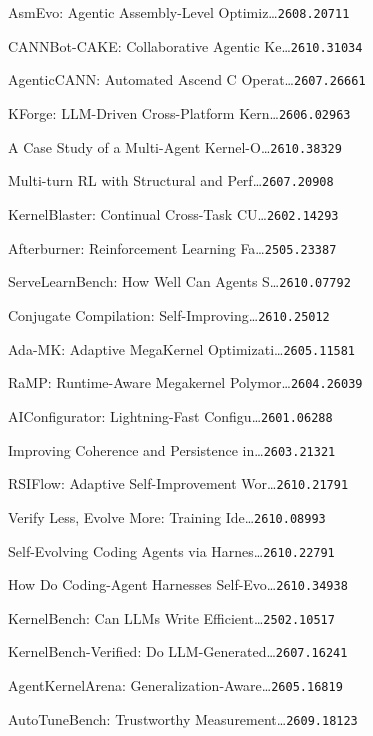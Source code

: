 \begin{refs}
[19] AsmEvo: Agentic Assembly-Level Optimiz\ldots{}\hfill{\texttt{2608.20711}}\par
[20] CANNBot-CAKE: Collaborative Agentic Ke\ldots{}\hfill{\texttt{2610.31034}}\par
[21] AgenticCANN: Automated Ascend C Operat\ldots{}\hfill{\texttt{2607.26661}}\par
[22] KForge: LLM-Driven Cross-Platform Kern\ldots{}\hfill{\texttt{2606.02963}}\par
[23] A Case Study of a Multi-Agent Kernel-O\ldots{}\hfill{\texttt{2610.38329}}\par
[24] Multi-turn RL with Structural and Perf\ldots{}\hfill{\texttt{2607.20908}}\par
[25] KernelBlaster: Continual Cross-Task CU\ldots{}\hfill{\texttt{2602.14293}}\par
[26] Afterburner: Reinforcement Learning Fa\ldots{}\hfill{\texttt{2505.23387}}\par
[27] ServeLearnBench: How Well Can Agents S\ldots{}\hfill{\texttt{2610.07792}}\par
[28] Conjugate Compilation: Self-Improving\ldots{}\hfill{\texttt{2610.25012}}\par
[29] Ada-MK: Adaptive MegaKernel Optimizati\ldots{}\hfill{\texttt{2605.11581}}\par
[30] RaMP: Runtime-Aware Megakernel Polymor\ldots{}\hfill{\texttt{2604.26039}}\par
[31] AIConfigurator: Lightning-Fast Configu\ldots{}\hfill{\texttt{2601.06288}}\par
[32] Improving Coherence and Persistence in\ldots{}\hfill{\texttt{2603.21321}}\par
[33] RSIFlow: Adaptive Self-Improvement Wor\ldots{}\hfill{\texttt{2610.21791}}\par
[34] Verify Less, Evolve More: Training Ide\ldots{}\hfill{\texttt{2610.08993}}\par
[35] Self-Evolving Coding Agents via Harnes\ldots{}\hfill{\texttt{2610.22791}}\par
[36] How Do Coding-Agent Harnesses Self-Evo\ldots{}\hfill{\texttt{2610.34938}}\par
[37] KernelBench: Can LLMs Write Efficient\ldots{}\hfill{\texttt{2502.10517}}\par
[38] KernelBench-Verified: Do LLM-Generated\ldots{}\hfill{\texttt{2607.16241}}\par
[39] AgentKernelArena: Generalization-Aware\ldots{}\hfill{\texttt{2605.16819}}\par
[40] AutoTuneBench: Trustworthy Measurement\ldots{}\hfill{\texttt{2609.18123}}\par
\end{refs}
\endgroup
